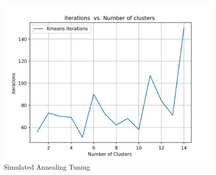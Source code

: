 \documentclass[a4paper,12pt]{article}
\begin{document}
\begin{figure}[!htb]
\begin{minipage}{0.25\textwidth}
   \end{minipage}\hfill
    \begin{minipage}{0.25\textwidth}
     \centering
     \includegraphics[width=.95\linewidth]{kmeans_iter_nn_5}
   \end{minipage}\hfill
 \caption { Simulated Annealing Tuning}
\end{figure}
\end{document}
